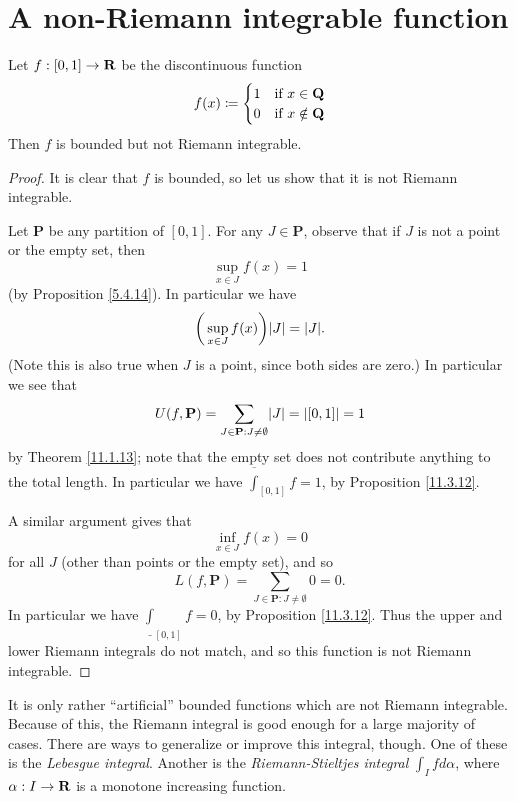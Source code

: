 \section{A non-Riemann integrable function}\label{sec 11.7}

\begin{proposition}\label{11.7.1}
    Let \(f : [0, 1] \to \mathbf{R}\) be the discontinuous function
    \[
        f(x) \coloneqq \begin{cases}
            1 & \text{if } x \in \mathbf{Q}    \\
            0 & \text{if } x \notin \mathbf{Q}
        \end{cases}
    \]
    Then \(f\) is bounded but not Riemann integrable.
\end{proposition}

\begin{proof}
    It is clear that \(f\) is bounded, so let us show that it is not Riemann integrable.

    Let \(\mathbf{P}\) be any partition of \([0, 1]\).
    For any \(J \in \mathbf{P}\), observe that if \(J\) is not a point or the empty set, then
    \[
        \sup_{x \in J} f(x) = 1
    \]
    (by Proposition \ref{5.4.14}).
    In particular we have
    \[
        \bigg(\sup_{x \in J} f(x)\bigg) \abs{J} = \abs{J}.
    \]
    (Note this is also true when \(J\) is a point, since both sides are zero.)
    In particular we see that
    \[
        U(f, \mathbf{P}) = \sum_{J \in \mathbf{P} : J \neq \emptyset} \abs{J} = \abs{[0, 1]} = 1
    \]
    by Theorem \ref{11.1.13};
    note that the empty set does not contribute anything to the total length.
    In particular we have \(\overline{\int}_{[0, 1]} f = 1\), by Proposition \ref{11.3.12}.

    A similar argument gives that
    \[
        \inf_{x \in J} f(x) = 0
    \]
    for all \(J\) (other than points or the empty set), and so
    \[
        L(f, \mathbf{P}) = \sum_{J \in \mathbf{P} : J \neq \emptyset} 0 = 0.
    \]
    In particular we have \(\underline{\int}_{[0, 1]} f = 0\), by Proposition \ref{11.3.12}.
    Thus the upper and lower Riemann integrals do not match, and so this function is not Riemann integrable.
\end{proof}

\begin{remark}\label{11.7.2}
    It is only rather ``artificial'' bounded functions which are not Riemann integrable.
    Because of this, the Riemann integral is good enough for a large majority of cases.
    There are ways to generalize or improve this integral, though.
    One of these is the \emph{Lebesgue integral}.
    Another is the \emph{Riemann-Stieltjes integral} \(\int_I f d\alpha\), where \(\alpha : I \to \mathbf{R}\) is a monotone increasing function.
\end{remark}